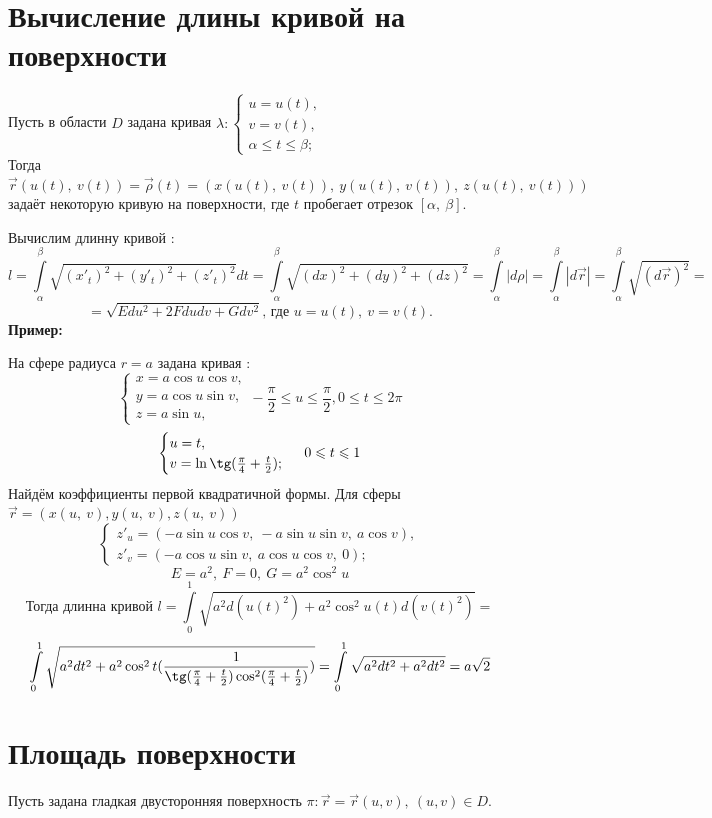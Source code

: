 \documentclass[../../main.tex]{subfiles}
\begin{document}
\section{Вычисление длины кривой на поверхности}


   Пусть в области $D$ задана кривая 
$\lambda : \begin{cases}
             u = u(t),\\
             v = v(t),\\
             \alpha \leq t \leq \beta;
            \end{cases}$\\
Тогда $\vec{r}(u(t), \ v(t)) = \vec{\rho}(t) = (x(u(t), \ v(t)), \ y(u(t), \ v(t)), \ z(u(t), \ v(t)))$ задаёт некоторую кривую на поверхности, где $t$ пробегает отрезок $\left[\alpha, \ \beta\right]$.

Вычислим длинну кривой : 
\[
l = \int\limits_\alpha^\beta\sqrt{(x'_t)^2 + (y'_t)^2 + (z'_t)^2}dt = \int\limits_\alpha^\beta\sqrt{(dx)^2 + (dy)^2 + (dz)^2} = \int\limits_\alpha^\beta  |d\rho| =  \int\limits_\alpha^\beta|d\vec{r}| = \int\limits_\alpha^\beta\sqrt{(d\vec{r})^2} = \] 
\[ 
= \sqrt{Edu^2 + 2Fdudv + Gdv^2} \text{, где } u = u(t), \ v = v(t). 
\]
\textbf{Пример:}

На сфере радиуса $r = a$ задана кривая :
\[\begin{cases}
 x = a\cos u\cos v,\\
 y = a\cos u\sin v,\\
 z = a\sin u,
 \end{cases}
 -\frac{\pi}{2} \leq u \leq \frac{\pi}{2},
 0\leq t \leq 2\pi\]
\[\begin{cases}
u = t,\\
v = \ln\tg(\frac{\pi}{4} + \frac{t}{2});
\end{cases} \ 0 \leq t \leq 1\]
Найдём коэффициенты первой квадратичной формы. Для сферы $\vec{r} = (x(u, \ v), y(u, \ v), z(u, \ v))$
\[
\begin{cases}
z'_u = (-a\sin u\cos v, \ -a\sin u\sin v, \ a\cos v),\\
z'_v = (-a\cos u\sin v, \ a\cos u\cos v, \ 0);
\end{cases}
\]
\[
E = a^2, \ F = 0, \ G = a^2\cos^2u
\]
\[
\text{Тогда длинна кривой } l = \int\limits_0^1\sqrt{a^2d(u(t)^2) + a^2\cos^2u(t)d(v(t)^2)} =
\]
\[\int\limits_0^1\sqrt{a^2dt^2 + a^2\cos^2t(\frac{1}{\tg(\frac{\pi}{4} + \frac{t}{2})\cos^2(\frac{\pi}{4} + \frac{t}{2})})} = \int\limits_0^1\sqrt{a^2dt^2 + a^2dt^2} = a\sqrt{2}
\]
\section{Площадь поверхности}
Пусть задана гладкая двусторонняя поверхность $\pi : \vec{r} = \vec{r}(u, v), \ (u, v) \in D$.
\end{document}

